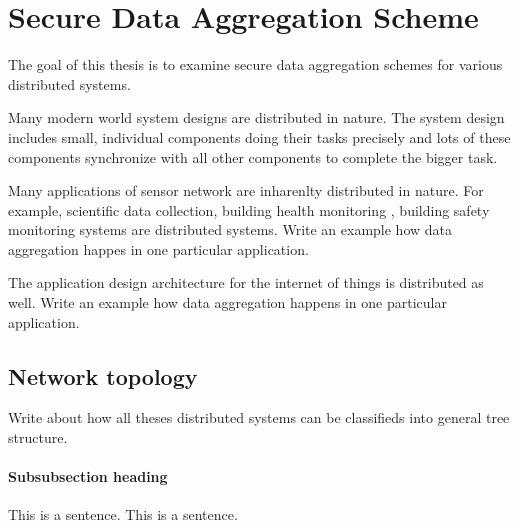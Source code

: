 \chapter{Secure Data Aggregation Scheme}

	The goal of this thesis is to examine secure data aggregation schemes for various distributed systems. 

	Many modern world system designs are distributed in nature. The system design includes small, individual components doing their tasks precisely and lots of these components synchronize with all other components to complete the bigger task.  


	Many applications of sensor network are inharenlty distributed in nature.
	For example, scientific data collection, building health monitoring , building safety monitoring systems are distributed systems.
	Write an example how data aggregation happes in one particular application.\cite{wagner2004resilient}

	The application design architecture for the internet of things is distributed as well. Write an example how data aggregation happens in one particular application.
	\cite{green1982analysis}


%
%
\section{Network topology}

Write about how all theses distributed systems can be classifieds into general tree structure.


\subsubsection{Subsubsection heading}

This is a sentence.
This is a sentence.

	